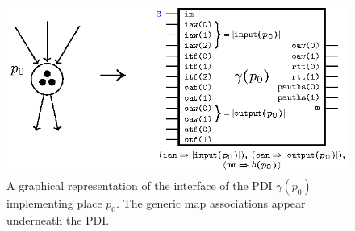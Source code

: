 \begin{definition}
  \begin{figure}[h]
    \centering
    \includegraphics[keepaspectratio,width=.7\textwidth]{gen-pci-ex.eps}
    \caption{A graphical representation of the interface of the PDI
      $\gamma(p_0)$ implementing place $p_0$. The generic map
      associations appear underneath the PDI.}
    \label{fig:gen-pci-ex}
  \end{figure}
  
  \bigskip
  
  \begin{enumerate}[resume]



\end{enumerate}
\end{definition}
